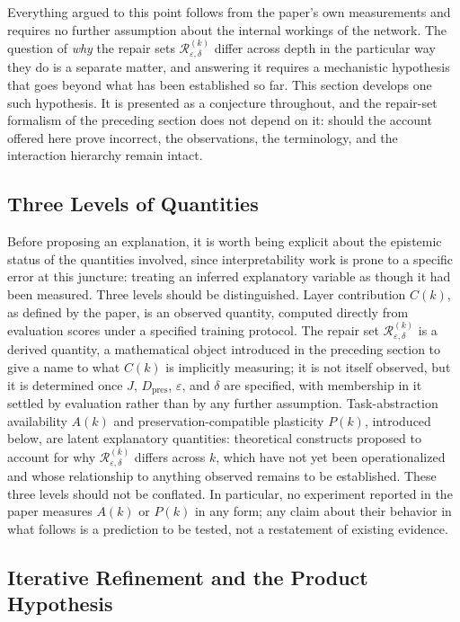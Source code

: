 \documentclass[11pt]{article}
\begin{document}
Everything argued to this point follows from the paper's own measurements and requires no further assumption about the internal workings of the network. The question of \emph{why} the repair sets $\mathcal{R}^{(k)}_{\varepsilon,\delta}$ differ across depth in the particular way they do is a separate matter, and answering it requires a mechanistic hypothesis that goes beyond what has been established so far. This section develops one such hypothesis. It is presented as a conjecture throughout, and the repair-set formalism of the preceding section does not depend on it: should the account offered here prove incorrect, the observations, the terminology, and the interaction hierarchy remain intact.

\subsection{Three Levels of Quantities}

Before proposing an explanation, it is worth being explicit about the epistemic status of the quantities involved, since interpretability work is prone to a specific error at this juncture: treating an inferred explanatory variable as though it had been measured. Three levels should be distinguished. Layer contribution $C(k)$, as defined by the paper, is an observed quantity, computed directly from evaluation scores under a specified training protocol. The repair set $\mathcal{R}^{(k)}_{\varepsilon,\delta}$ is a derived quantity, a mathematical object introduced in the preceding section to give a name to what $C(k)$ is implicitly measuring; it is not itself observed, but it is determined once $J$, $D_{\mathrm{pres}}$, $\varepsilon$, and $\delta$ are specified, with membership in it settled by evaluation rather than by any further assumption. Task-abstraction availability $A(k)$ and preservation-compatible plasticity $P(k)$, introduced below, are latent explanatory quantities: theoretical constructs proposed to account for why $\mathcal{R}^{(k)}_{\varepsilon,\delta}$ differs across $k$, which have not yet been operationalized and whose relationship to anything observed remains to be established. These three levels should not be conflated. In particular, no experiment reported in the paper measures $A(k)$ or $P(k)$ in any form; any claim about their behavior in what follows is a prediction to be tested, not a restatement of existing evidence.

\subsection{Iterative Refinement and the Product Hypothesis}
\end{document}

